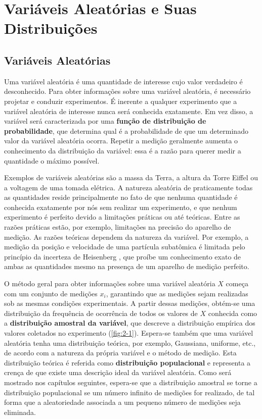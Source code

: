 \chapter{Variáveis Aleatórias e Suas Distribuições}

\section{Variáveis Aleatórias}
 
Uma variável aleatória é uma quantidade de interesse cujo valor verdadeiro é desconhecido. Para obter informações sobre uma variável aleatória, é necessário projetar e conduzir experimentos. É inerente a qualquer experimento que a variável aleatória de interesse nunca será conhecida exatamente. Em vez disso, a variável será caracterizada por uma \textbf{função de distribuição de probabilidade}, que determina qual é a probabilidade de que um determinado valor da variável aleatória ocorra. Repetir a medição geralmente aumenta o conhecimento da distribuição da variável: essa é a razão para querer medir a quantidade o máximo possível.

Exemplos de variáveis aleatórias são a massa da Terra, a altura da Torre Eiffel ou a voltagem de uma tomada elétrica. A natureza aleatória de praticamente todas as quantidades reside principalmente no fato de que nenhuma quantidade é conhecida exatamente por nós sem realizar um experimento, e que nenhum experimento é perfeito devido a limitações práticas ou até teóricas. Entre as razões práticas estão, por exemplo, limitações na precisão do aparelho de medição. As razões teóricas dependem da natureza da variável. Por exemplo, a medição da posição e velocidade de uma partícula subatômica é limitada pelo princípio da incerteza de Heisenberg \citep{heisenberg1927anschaulichen}, que proíbe um conhecimento exato de ambas as quantidades mesmo na presença de um aparelho de medição perfeito.

O método geral para obter informações sobre uma variável aleatória $X$ começa com um conjunto de medições $x_i$, garantindo que as medições sejam realizadas sob as mesmas condições experimentais. A partir dessas medições, obtém-se uma distribuição da frequência de ocorrência de todos os valores de $X$ conhecida como a \textbf{distribuição amostral da variável}, que descreve a distribuição empírica dos valores coletados no experimento (\autoref{fig:2-1}). Espera-se também que uma variável aleatória tenha uma distribuição teórica, por exemplo, Gaussiana, uniforme, etc., de acordo com a natureza da própria variável e o método de medição. Esta distribuição teórica é referida como \textbf{distribuição populacional} e representa a crença de que existe uma descrição ideal da variável aleatória. Como será mostrado nos capítulos seguintes, espera-se que a distribuição amostral se torne a distribuição populacional se um número infinito de medições for realizado, de tal forma que a aleatoriedade associada a um pequeno número de medições seja eliminada.

